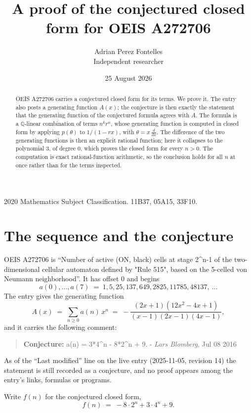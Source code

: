 \documentclass[11pt,a4paper]{article}
\title{A proof of the conjectured closed form for OEIS A272706}
\author{Adrian Perez Fontelles\\ \small Independent researcher}
\date{25 August 2026}
\theoremstyle{plain}
\theoremstyle{definition}
\begin{document}
\maketitle

\begin{abstract}
OEIS A272706 carries a conjectured closed form for its terms. We prove it. The entry
also posts a generating function $A(x)$; the conjecture is then exactly the statement
that the generating function of the conjectured formula agrees with $A$. The formula is
a $\mathbb{Q}$-linear combination of terms $n^{k}r^{n}$, whose generating function is
computed in closed form by applying $p(\theta)$ to $1/(1-rx)$, with
$\theta=x\,\frac{d}{dx}$. The difference of the two generating functions is then an
explicit rational function; here it collapses to the polynomial $3$, of degree
$0$, which proves the closed form for every $n>0$. The computation is exact
rational-function arithmetic, so the conclusion holds for all $n$ at once rather than
for the terms inspected.
\end{abstract}

\noindent\small 2020 Mathematics Subject Classification. 11B37, 05A15, 33F10.\normalsize

\section{The sequence and the conjecture}

OEIS A272706 is ``Number of active (ON, black) cells at stage 2\^{}n-1 of the two-dimensional cellular automaton defined by "Rule 515", based on the 5-celled von Neumann neighborhood''. It has offset $0$ and begins
\[
a(0),\dots,a(7)\;=\;1, 5, 25, 137, 649, 2825, 11785, 48137,\ \dots
\]
The entry gives the generating function
\begin{equation}\label{eq:gf}
A(x)\;=\;\sum_{n\ge 0} a(n)\,x^{n}\;=\;- \frac{\left(2 x + 1\right) \left(12 x^{2} - 4 x + 1\right)}{\left(x - 1\right) \left(2 x - 1\right) \left(4 x - 1\right)} ,
\end{equation}
and it carries the following comment:
\begin{quote}\small
\textbf{Conjecture:} a(n) = 3*4\^{}n - 8*2\^{}n + 9. - \emph{Lars Blomberg}, Jul 08 2016
\end{quote}
As of the ``Last modified'' line on the live entry (2025-11-05, revision 14) the
statement is still recorded as a conjecture, and no proof appears among the entry's links,
formulas or programs.

Write $f(n)$ for the conjectured closed form,
\[
f(n)\;=\;- 8 \cdot 2^{n} + 3 \cdot 4^{n} + 9 .
\]
\end{document}
